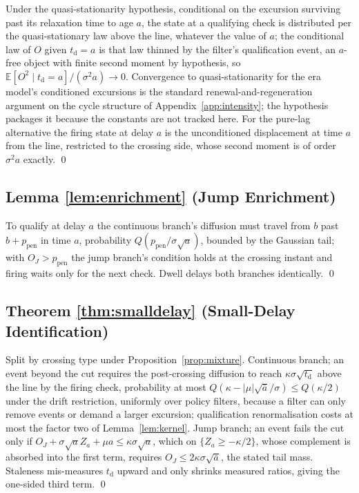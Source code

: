 \documentclass[11pt,a4paper]{article}
\theoremstyle{definition}
\theoremstyle{plain}
\theoremstyle{remark}
\newcommand{\surv}{Q}
\newcommand{\tact}{t_{\mathrm{d}}}
\begin{document}
Under the quasi-stationarity hypothesis, conditional on the excursion surviving past its relaxation time to age $a$, the state at a qualifying check is distributed per the quasi-stationary law
above the line, whatever the value of $a$; the conditional law of $O$ given $\tact = a$ is that law thinned by the filter's qualification event, an $a$-free object with finite second moment
by hypothesis, so $\mathbb{E}[O^2 \mid \tact = a]/(\sigma^2 a) \to 0$. Convergence to quasi-stationarity for the era model's conditioned excursions is the standard renewal-and-regeneration
argument on the cycle structure of Appendix~\ref{app:intensity}; the hypothesis packages it because the constants are not tracked here. For the pure-lag alternative the firing state at delay $a$
is the unconditioned displacement at time $a$ from the line, restricted to the crossing side, whose second moment is of order $\sigma^2 a$ exactly. \qed

\subsection{Lemma \ref{lem:enrichment} (Jump Enrichment)}

To qualify at delay $a$ the continuous branch's diffusion must travel from $b$ past $b + p_{\mathrm{pen}}$ in time $a$, probability $\surv(p_{\mathrm{pen}}/\sigma\sqrt{a})$, bounded by the Gaussian
tail; with $O_J > p_{\mathrm{pen}}$ the jump branch's condition holds at the crossing instant and firing waits only for the next check. Dwell delays both branches identically. \qed

\subsection{Theorem \ref{thm:smalldelay} (Small-Delay Identification)}

Split by crossing type under Proposition~\ref{prop:mixture}. Continuous branch; an event beyond the cut requires the post-crossing diffusion to reach $\kappa\sigma\sqrt{\tact}$ above the 
line by the firing check, probability at most $\surv(\kappa - |\mu|\sqrt{\bar
a}/\sigma) \le \surv(\kappa/2)$ under the drift restriction, uniformly over policy filters, because a filter can only remove events or demand a larger excursion; qualification renormalisation
costs at most the factor two of Lemma~\ref{lem:kernel}. Jump branch; an event fails the cut only if $O_J + \sigma\sqrt{a} Z_a +
\mu a \le \kappa\sigma\sqrt{a}$, which on $\{Z_a \ge -\kappa/2\}$,
whose complement is absorbed into the first term, requires $O_J \le
2\kappa\sigma\sqrt{\bar a}$, the stated tail mass. Staleness mis-measures $\tact$ upward and only shrinks measured ratios, giving the one-sided third term. \qed
\end{document}
